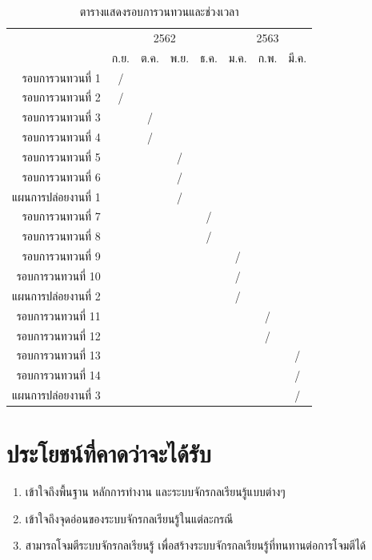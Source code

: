 \documentclass{cpereport}
\begin{document}
\begin{table}[]
    \centering
    \begin{tabular}{r|cccc|ccc}
    \hline \hline
     & \multicolumn{4}{c|}{2562} & \multicolumn{3}{c}{2563} \\
     & ก.ย. & ต.ค. & พ.ย. & ธ.ค. & ม.ค. & ก.พ. & มี.ค. \\ \hline
    รอบการวนทวนที่ 1 & / &  &  &  &  &  &  \\
    รอบการวนทวนที่ 2 & / &  &  &  &  &  &  \\
    รอบการวนทวนที่ 3 &  & / &  &  &  &  &  \\
    รอบการวนทวนที่ 4 &  & / &  &  &  &  &  \\
    รอบการวนทวนที่ 5 &  &  & / &  &  &  &  \\
    รอบการวนทวนที่ 6 &  &  & / &  &  &  &  \\
    แผนการปล่อยงานที่ 1 &  &  & / &  &  &  &  \\
    รอบการวนทวนที่ 7 &  &  &  & / &  &  &  \\
    รอบการวนทวนที่ 8 &  &  &  & / &  &  &  \\
    รอบการวนทวนที่ 9 &  &  &  &  & / &  &  \\
    รอบการวนทวนที่ 10 &  &  &  &  & / &  &  \\
    แผนการปล่อยงานที่ 2 &  &  &  &  & / &  &  \\
    รอบการวนทวนที่ 11 &  &  &  &  &  & / &  \\
    รอบการวนทวนที่ 12 &  &  &  &  &  & / &  \\
    รอบการวนทวนที่ 13 &  &  &  &  &  &  & / \\
    รอบการวนทวนที่ 14 &  &  &  &  &  &  & / \\
    แผนการปล่อยงานที่ 3 &  &  &  &  &  &  & / \\
    \hline \hline
    \end{tabular}
    \caption{ตารางแสดงรอบการวนทวนและช่วงเวลา}
    \label{iteration-timetable}
\end{table}

\section{ประโยชน์ที่คาดว่าจะได้รับ}
\begin{enumerate}
    \item เข้าใจถึงพื้นฐาน หลักการทำงาน และระบบจักรกลเรียนรู้แบบต่างๆ
    \item เข้าใจถึงจุดอ่อนของระบบจักรกลเรียนรู้ในแต่ละกรณี
    \item สามารถโจมตีระบบจักรกลเรียนรู้ เพื่อสร้างระบบจักรกลเรียนรู้ที่ทนทานต่อการโจมตีได้
\end{enumerate}
\end{document}
